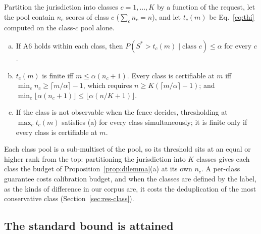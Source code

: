 \begin{corollary}\label{cor:mondrian}
Partition the jurisdiction into classes $c=1,\dots,K$ by a function of the request, let the pool contain $n_c$ scores of class $c$ ($\sum_c n_c=n$), and let $t_c(m)$ be Eq.~\eqref{eq:thi} computed on the class-$c$ pool alone.
\begin{enumerate}[(a),leftmargin=*,itemsep=1pt]
\item If A6 holds within each class, then $P(S^\ast>t_c(m)\mid\text{class } c)\le\alpha$ for every $c$.
\item $t_c(m)$ is finite iff $m\le\alpha(n_c+1)$. Every class is certifiable at $m$ iff $\min_c n_c\ge\lceil m/\alpha\rceil-1$, which requires $n\ge K(\lceil m/\alpha\rceil-1)$; and $\min_c\lfloor\alpha(n_c+1)\rfloor\le\lfloor\alpha(n/K+1)\rfloor$.
\item If the class is not observable when the fence decides, thresholding at $\max_c t_c(m)$ satisfies (a) for every class simultaneously; it is finite only if every class is certifiable at $m$.
\end{enumerate}
\end{corollary}

Each class pool is a sub-multiset of the pool, so its threshold sits at an equal or higher rank from the top: partitioning the jurisdiction into $K$ classes gives each class the budget of Proposition~\ref{prop:dilemma}(a) at its own $n_c$. A per-class guarantee costs calibration budget, and when the classes are defined by the label, as the kinds of difference in our corpus are, it costs the deduplication of the most conservative class (Section~\ref{sec:res-class}).

\subsection{The standard bound is attained}\label{sec:tight}

